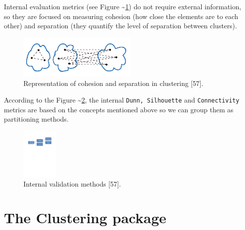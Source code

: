 \documentclass[
]{article}
\begin{document}
Internal evaluation metrics (see Figure \textasciitilde{}\ref{cohesion})
do not require external information, so they are focused on measuring
cohesion (how close the elements are to each other) and separation (they
quantify the level of separation between clusters).

\begin{figure}
\centering
\includegraphics[width=\textwidth,height=0.83333in]{img/cohesion.png}
\caption{Representation of cohesion and separation in clustering
{[}57{]}. \label{cohesion}}
\end{figure}

According to the Figure \textasciitilde{}\ref{internal}, the internal
\texttt{Dunn, Silhouette} and \texttt{Connectivity} metrics are based on
the concepts mentioned above so we can group them as partitioning
methods.

\begin{figure}
\centering
\includegraphics[width=\textwidth,height=0.98958in]{img/internal.pdf}
\caption{Internal validation methods {[}57{]}. \label{internal}}
\end{figure}

\hypertarget{the-clustering-package}{%
\section{\texorpdfstring{The \textbf{Clustering} package
\label{sec:seccion3}}{The Clustering package }}\label{the-clustering-package}}
\end{document}
